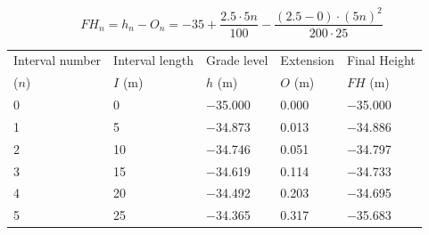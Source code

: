 \documentclass{bcrre_exam}
\begin{document}
\begin{questions}
\begin{solution}
\begin{equation}
    FH_n = h_n - O_n = -35+\frac{2.5 \cdot 5n}{100} - \frac{(2.5-0)\cdot (5n)^2}{200 \cdot 25}
\end{equation}

\vspace{1cm}

\begin{tabular}{@{}lllll@{}}
\toprule
Interval number & Interval length & Grade level & Extension & Final Height \\
($n$) & $I$ (\unit{m}) & $h$ (\unit{m}) & $O$ (\unit{m}) & $FH$ (\unit{m}) \\
\midrule
\num{0} & \num{0}  & \num{-35.000} & \num{0.000} & \num{-35.000} \\
\num{1} & \num{5}  & \num{-34.873} & \num{0.013} & \num{-34.886} \\
\num{2} & \num{10} & \num{-34.746} & \num{0.051} & \num{-34.797} \\
\num{3} & \num{15} & \num{-34.619} & \num{0.114} & \num{-34.733} \\
\num{4} & \num{20} & \num{-34.492} & \num{0.203} & \num{-34.695} \\
\num{5} & \num{25} & \num{-34.365} & \num{0.317} & \num{-35.683} \\ \bottomrule
\end{tabular}

\end{solution}

\end{questions}
\end{document}
